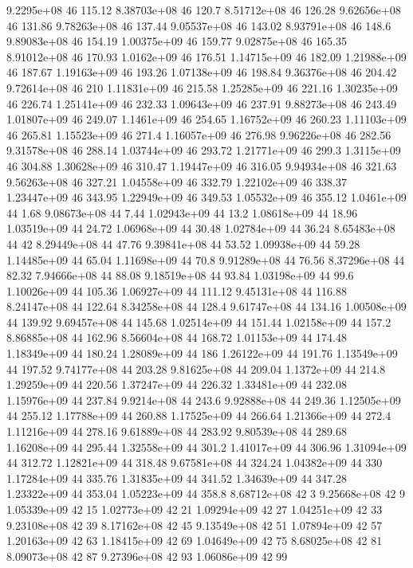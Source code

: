 9.2295e+08 46 115.12
8.38703e+08 46 120.7
8.51712e+08 46 126.28
9.62656e+08 46 131.86
9.78263e+08 46 137.44
9.05537e+08 46 143.02
8.93791e+08 46 148.6
9.89083e+08 46 154.19
1.00375e+09 46 159.77
9.02875e+08 46 165.35
8.91012e+08 46 170.93
1.0162e+09 46 176.51
1.14715e+09 46 182.09
1.21988e+09 46 187.67
1.19163e+09 46 193.26
1.07138e+09 46 198.84
9.36376e+08 46 204.42
9.72614e+08 46 210
1.11831e+09 46 215.58
1.25285e+09 46 221.16
1.30235e+09 46 226.74
1.25141e+09 46 232.33
1.09643e+09 46 237.91
9.88273e+08 46 243.49
1.01807e+09 46 249.07
1.1461e+09 46 254.65
1.16752e+09 46 260.23
1.11103e+09 46 265.81
1.15523e+09 46 271.4
1.16057e+09 46 276.98
9.96226e+08 46 282.56
9.31578e+08 46 288.14
1.03744e+09 46 293.72
1.21771e+09 46 299.3
1.3115e+09 46 304.88
1.30628e+09 46 310.47
1.19447e+09 46 316.05
9.94934e+08 46 321.63
9.56263e+08 46 327.21
1.04558e+09 46 332.79
1.22102e+09 46 338.37
1.23447e+09 46 343.95
1.22949e+09 46 349.53
1.05532e+09 46 355.12
1.0461e+09 44 1.68
9.08673e+08 44 7.44
1.02943e+09 44 13.2
1.08618e+09 44 18.96
1.03519e+09 44 24.72
1.06968e+09 44 30.48
1.02784e+09 44 36.24
8.65483e+08 44 42
8.29449e+08 44 47.76
9.39841e+08 44 53.52
1.09938e+09 44 59.28
1.14485e+09 44 65.04
1.11698e+09 44 70.8
9.91289e+08 44 76.56
8.37296e+08 44 82.32
7.94666e+08 44 88.08
9.18519e+08 44 93.84
1.03198e+09 44 99.6
1.10026e+09 44 105.36
1.06927e+09 44 111.12
9.45131e+08 44 116.88
8.24147e+08 44 122.64
8.34258e+08 44 128.4
9.61747e+08 44 134.16
1.00508e+09 44 139.92
9.69457e+08 44 145.68
1.02514e+09 44 151.44
1.02158e+09 44 157.2
8.86885e+08 44 162.96
8.56604e+08 44 168.72
1.01153e+09 44 174.48
1.18349e+09 44 180.24
1.28089e+09 44 186
1.26122e+09 44 191.76
1.13549e+09 44 197.52
9.74177e+08 44 203.28
9.81625e+08 44 209.04
1.1372e+09 44 214.8
1.29259e+09 44 220.56
1.37247e+09 44 226.32
1.33481e+09 44 232.08
1.15976e+09 44 237.84
9.9214e+08 44 243.6
9.92888e+08 44 249.36
1.12505e+09 44 255.12
1.17788e+09 44 260.88
1.17525e+09 44 266.64
1.21366e+09 44 272.4
1.11216e+09 44 278.16
9.61889e+08 44 283.92
9.80539e+08 44 289.68
1.16208e+09 44 295.44
1.32558e+09 44 301.2
1.41017e+09 44 306.96
1.31094e+09 44 312.72
1.12821e+09 44 318.48
9.67581e+08 44 324.24
1.04382e+09 44 330
1.17284e+09 44 335.76
1.31835e+09 44 341.52
1.34639e+09 44 347.28
1.23322e+09 44 353.04
1.05223e+09 44 358.8
8.68712e+08 42 3
9.25668e+08 42 9
1.05339e+09 42 15
1.02773e+09 42 21
1.09294e+09 42 27
1.04251e+09 42 33
9.23108e+08 42 39
8.17162e+08 42 45
9.13549e+08 42 51
1.07894e+09 42 57
1.20163e+09 42 63
1.18415e+09 42 69
1.04649e+09 42 75
8.68025e+08 42 81
8.09073e+08 42 87
9.27396e+08 42 93
1.06086e+09 42 99
